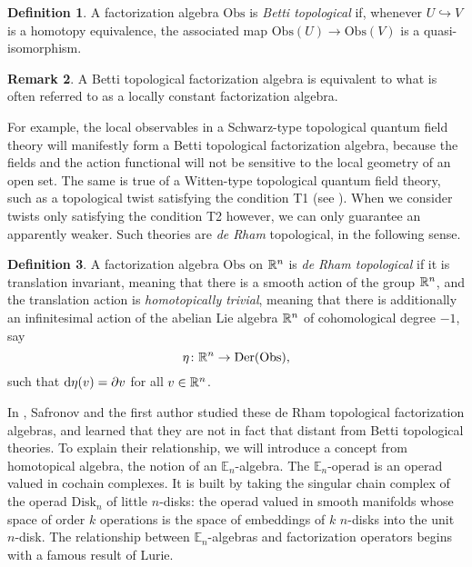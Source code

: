 \documentclass[11pt, oneside, reqno]{amsart}
\theoremstyle{definition} \newtheorem{definition}{Definition}[section]
\theoremstyle{definition}
\theoremstyle{remark}
\theoremstyle{definition} \newtheorem{remark}[definition]{Remark}
\theoremstyle{definition} \newtheorem{remarks}[definition]{Remarks}
\theoremstyle{definition} \newtheorem{question}[definition]{Question}
\theoremstyle{definition} \newtheorem*{note}{Note}
\theoremstyle{definition} \newtheorem{example}[definition]{Example}
\theoremstyle{definition} \newtheorem{examples}[definition]{Examples}
\newcommand{\dd}{\partial}
\newcommand{\inj}{\hookrightarrow}
\newcommand{\bb}[1]{\mathbb{#1}}
\newcommand{\mr}[1]{\mathrm{#1}}
\def\d{{\rm d}}
\newcommand{\obs}{\mathrm{Obs}}
\begin{document}
\begin{definition}
A factorization algebra $\obs$ is \emph{Betti topological} if, whenever $U \inj V$ is a homotopy equivalence, the associated map $\obs(U) \to \obs(V)$ is a quasi-isomorphism.
\end{definition}

\begin{remark}
A Betti topological factorization algebra is equivalent to what is often referred to as a locally constant factorization algebra.
\end{remark}

For example, the local observables in a Schwarz-type topological quantum field theory will manifestly form a Betti topological factorization algebra, because the fields and the action functional will not be sensitive to the local geometry of an open set.  The same is true of a Witten-type topological quantum field theory, such as a topological twist satisfying the condition T1 (see \cite[Section 3.5]{ElliottSafronov}).  When we consider twists only satisfying the condition T2 however, we can only guarantee an apparently weaker.  Such theories are \emph{de Rham} topological, in the following sense.

\begin{definition}
A factorization algebra $\obs$ on $\mathbb R^{n}$ is \emph{de Rham topological} if it is translation invariant, meaning that there is a smooth action of the group $\mathbb R^{n}$, and the translation action is \emph{homotopically trivial}, meaning that there is additionally an infinitesimal action of the abelian Lie algebra $\mathbb R^{n}$ of cohomological degree $-1$, say
\[\eta \colon \RR^{n} \to \mr{Der}(\obs),\]
such that $\d \eta(v) = \dd v$ for all $v \in \mathbb R^{n}$.
\end{definition}

In \cite{ElliottSafronov}, Safronov and the first author studied these de Rham topological factorization algebras, and learned that they are not in fact that distant from Betti topological theories.  To explain their relationship, we will introduce a concept from homotopical algebra, the notion of an $\bb E_n$-algebra.  The $\bb E_n$-operad is an operad valued in cochain complexes.  It is built by taking the singular chain complex of the operad $\mr{Disk}_n$ of little $n$-disks: the operad valued in smooth manifolds whose space of order $k$ operations is the space of embeddings of $k$ $n$-disks into the unit $n$-disk.  The relationship between $\bb E_n$-algebras and factorization operators begins with a famous result of Lurie.
\end{document}

